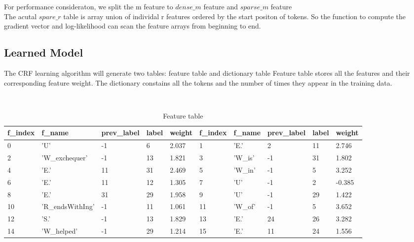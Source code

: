 For performance consideraton, we split the m feature to $dense\_m$ feature and $sparse\_m$ feature\\
The acutal $spare\_r$ table is array union of individal r features ordered by the start positon of tokens.
So the function to compute the gradient vector and log-likelihood can scan the feature arrays from beginning to end.

\subsection{Learned Model}
The CRF learning algorithm will generate two tables: feature table and dictionary table
Feature table stores all the features and their corresponding feature weight.
The dictionary constains all the tokens and the number of times they appear in the training data.\\
\begin {table}[h]
\caption {Feature table} \label{tab:featuretbl} 
\begin{center}
    \scriptsize\tt
    \begin{tabular}{ | l | l | l | l | l || l | l | l | l | l | }
    \hline
    f\_index & f\_name & prev\_label & label & weight & f\_index & f\_name & prev\_label & label & weight\\
    \hline
    0&'U'&-1&6&2.037& 1&'E.'&2&11&2.746   \\
    2&'W\_exchequer'&-1&13&1.821& 3&'W\_is'&-1&31&1.802 \\
    4&'E.'&11&31&2.469& 5&'W\_in'&-1&5&3.252 \\
    6&'E.'&11&12&1.305& 7&'U'&-1&2&-0.385 \\
    8&'E.'&31&29&1.958& 9&'U'&-1&29&1.422 \\
    10&'R\_endsWithIng'&-1&11&1.061&11&'W\_of'&-1&5&3.652 \\
    12&'S.'&-1&13&1.829& 13&'E.'&24&26&3.282 \\
    14&'W\_helped'&-1&29&1.214& 15&'E.'&11&24&1.556 \\
    \hline
    \end{tabular}
\end{center}
\end {table}

